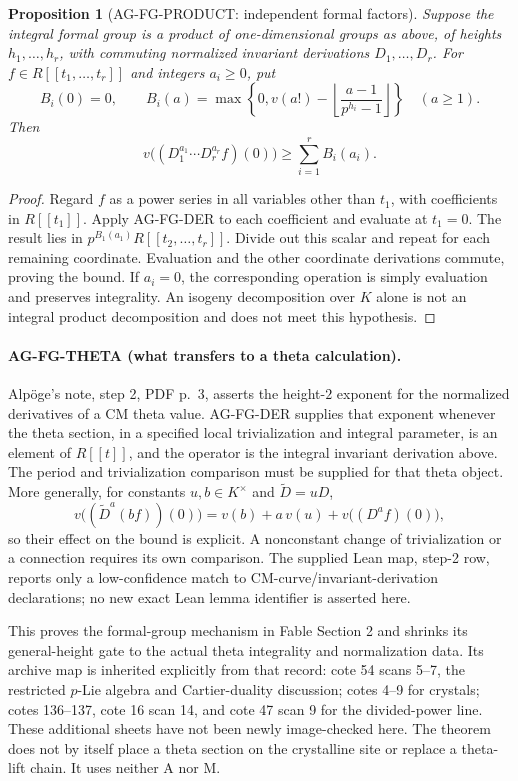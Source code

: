 \documentclass[11pt,a4paper]{article}
\newtheorem{proposition}{Proposition}
\begin{document}
\begin{proposition}[AG-FG-PRODUCT: independent formal factors]
Suppose the integral formal group is a product of one-dimensional
groups as above, of heights $h_1,\ldots,h_r$, with commuting
normalized invariant derivations $D_1,\ldots,D_r$. For
$f\in R[[t_1,\ldots,t_r]]$ and integers $a_i\ge0$, put
\[
 B_i(0)=0,\qquad B_i(a)=
 \max\left\{0,v(a!)-
       \left\lfloor\frac{a-1}{p^{h_i}-1}\right\rfloor\right\}
          \quad(a\ge1).
\]
Then
\[
 v\bigl((D_1^{a_1}\cdots D_r^{a_r}f)(0)\bigr)
       \ge\sum_{i=1}^r B_i(a_i).
\]
\end{proposition}
\begin{proof}
Regard $f$ as a power series in all variables other than $t_1$,
with coefficients in $R[[t_1]]$. Apply AG-FG-DER to each
coefficient and evaluate at $t_1=0$. The result lies in
$p^{B_1(a_1)}R[[t_2,\ldots,t_r]]$. Divide out this scalar and
repeat for each remaining coordinate. Evaluation and the other
coordinate derivations commute, proving the bound. If $a_i=0$,
the corresponding operation is simply evaluation and preserves
integrality. An isogeny decomposition over $K$ alone is not an
integral product decomposition and does not meet this hypothesis.
\end{proof}

\paragraph{AG-FG-THETA (what transfers to a theta calculation).}
Alpöge's note, step 2, PDF p.~3, asserts the height-$2$ exponent
for the normalized derivatives of a CM theta value. AG-FG-DER
supplies that exponent whenever the theta section, in a specified
local trivialization and integral parameter, is an element of
$R[[t]]$, and the operator is the integral invariant derivation
above. The period and trivialization comparison must be supplied
for that theta object. More generally, for constants
$u,b\in K^\times$ and $\widetilde D=uD$,
\[
 v\bigl((\widetilde D^{a}(bf))(0)\bigr)
  =v(b)+a\,v(u)+v\bigl((D^af)(0)\bigr),
\]
so their effect on the bound is explicit. A nonconstant change of
trivialization or a connection requires its own comparison.
The supplied Lean map, step-2 row, reports only a low-confidence
match to CM-curve/invariant-derivation declarations; no new exact
Lean lemma identifier is asserted here.

This proves the formal-group mechanism in Fable Section 2 and
shrinks its general-height gate to the actual theta integrality
and normalization data. Its archive map is inherited explicitly
from that record: cote 54 scans 5--7, the restricted $p$-Lie
algebra and Cartier-duality discussion; cotes 4--9 for crystals;
cotes 136--137, cote 16 scan 14, and cote 47 scan 9 for the
divided-power line. These additional sheets have not been newly
image-checked here. The theorem does not by itself place a theta
section on the crystalline site or replace a theta-lift chain.
It uses neither A nor M.
\end{document}
